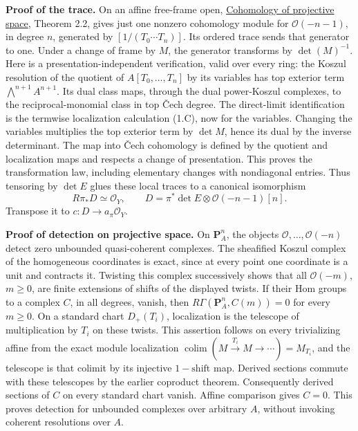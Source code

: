 \documentclass[11pt]{article}
\begin{document}
\textbf{Proof of the trace.} On an affine free-frame open,
\href{cohomology-of-projective-space.md}{Cohomology of projective
space}, Theorem 2.2, gives just one nonzero cohomology module for
\(\mathcal O(-n-1)\), in degree \(n\), generated by
\([1/(T_0\cdots T_n)]\). Its ordered trace sends that generator to one.
Under a change of frame by \(M\), the generator transforms by
\(\det(M)^{-1}\). Here is a presentation-independent verification, valid
over every ring: the Koszul resolution of the quotient of
\(A[T_0,\ldots,T_n]\) by its variables has top exterior term
\(\bigwedge^{n+1}A^{n+1}\). Its dual class maps, through the dual
power-Koszul complexes, to the reciprocal-monomial class in top Čech
degree. The direct-limit identification is the termwise localization
calculation (1.C), now for the variables. Changing the variables
multiplies the top exterior term by \(\det M\), hence its dual by the
inverse determinant. The map into Čech cohomology is defined by the
quotient and localization maps and respects a change of presentation.
This proves the transformation law, including elementary changes with
nondiagonal entries. Thus tensoring by \(\det E\) glues these local
traces to a canonical isomorphism \[
R\pi_*D\simeq\mathcal O_Y,
\qquad D=\pi^*\det E\otimes\mathcal O(-n-1)[n].
\tag{4.A}
\] Transpose it to \(c:D\to a_\pi\mathcal O_Y\).

\textbf{Proof of detection on projective space.} On \(\mathbf P_A^n\),
the objects \(\mathcal O,\ldots,\mathcal O(-n)\) detect zero unbounded
quasi-coherent complexes. The sheafified Koszul complex of the
homogeneous coordinates is exact, since at every point one coordinate is
a unit and contracts it. Twisting this complex successively shows that
all \(\mathcal O(-m)\), \(m\geq0\), are finite extensions of shifts of
the displayed twists. If their Hom groups to a complex \(C\), in all
degrees, vanish, then \(R\Gamma(\mathbf P_A^n,C(m))=0\) for every
\(m\geq0\). On a standard chart \(D_+(T_i)\), localization is the
telescope of multiplication by \(T_i\) on these twists. This assertion
follows on every trivializing affine from the exact module localization
\(\operatorname{colim}(M\xrightarrow{T_i}M\to\cdots)=M_{T_i}\), and the
telescope is that colimit by its injective \(1-\mathrm{shift}\) map.
Derived sections commute with these telescopes by the earlier coproduct
theorem. Consequently derived sections of \(C\) on every standard chart
vanish. Affine comparison gives \(C=0\). This proves detection for
unbounded complexes over arbitrary \(A\), without invoking coherent
resolutions over \(A\).
\end{document}
